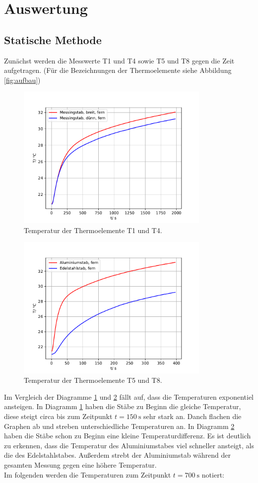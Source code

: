 \section{Auswertung}

\subsection{Statische Methode}
Zunächst werden die Messwerte T1 und T4 sowie T5 und T8 gegen die Zeit aufgetragen.
(Für die Bezeichnungen der Thermoelemente siehe Abbildung \ref{fig:aufbau})
\begin{figure}[H]
  \centering
  \includegraphics[height=7cm]{T14.pdf}
  \caption{Temperatur der Thermoelemente T1 und T4.}
  \label{fig:T14}
\end{figure}
\begin{figure}[H]
  \centering
  \includegraphics[height=7cm]{T58.pdf}
  \caption{Temperatur der Thermoelemente T5 und T8.}
  \label{fig:T58}
\end{figure}
Im Vergleich der Diagramme \ref{fig:T14} und \ref{fig:T58} fällt auf, dass
die Temperaturen exponentiel ansteigen. In Diagramm \ref{fig:T14} haben die
Stäbe zu Beginn die gleiche Temperatur, diese steigt circa bis zum Zeitpunkt
$t=\SI{150}{\s}$ sehr stark an. Danch flachen die Graphen ab und streben unterschiedliche
Temperaturen an. In Diagramm \ref{fig:T58} haben die Stäbe schon zu Beginn eine kleine
Temperaturdifferenz. Es ist deutlich zu erkennen, dass die Temperatur des
Aluminiumstabes viel schneller ansteigt, als die des Edelstahlstabes. Außerdem
strebt der Aluminiumstab während der gesamten Messung gegen eine höhere Temperatur.\\
Im folgenden werden die Temperaturen zum Zeitpunkt $t=\SI{700}{\s}$ notiert:

